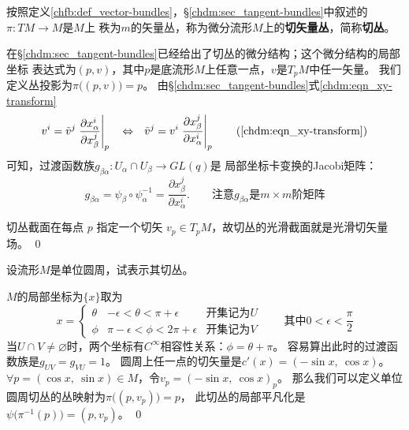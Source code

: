 \begin{example}\label{chfb:exm_tb}
    按照定义\ref{chfb:def_vector-bundles}，\S \ref{chdm:sec_tangent-bundles}中叙述的$\pi:TM\to M$是$M$上
    秩为$m$的矢量丛，称为微分流形$M$上的\textbf{切矢量丛}，简称\textbf{切丛}。
\end{example}
在\S \ref{chdm:sec_tangent-bundles}已经给出了切丛的微分结构；这个微分结构的局部坐标
表达式为$(p,v)$，其中$p$是底流形$M$上任意一点，$v$是$T_pM$中任一矢量。
我们定义丛投影为$\pi\bigl( (p,v)\bigr)=p$。
由\S \ref{chdm:sec_tangent-bundles}式\eqref{chdm:eqn_xy-transform}
\begin{equation}
    v^i = \tilde{v}^j \left. \frac{\partial {x}^i_\alpha}{\partial {x}^j_\beta}  \right | _p
    {\quad \Leftrightarrow \quad}
    \tilde{v}^j = {v}^i \left. \frac{\partial {x}^j_\beta}{\partial {x}^i_\alpha}  \right | _p
    \tag{\ref{chdm:eqn_xy-transform}}
\end{equation}
可知，过渡函数族$g_{\beta\alpha}: U_\alpha \cap U_\beta \to GL(q)$是
局部坐标卡变换的Jacobi矩阵：
\begin{equation}
    g_{\beta\alpha} = \psi_\beta \circ \psi^{-1}_{\alpha}
    = \frac{\partial {x}^j_\beta}{\partial {x}^i_\alpha}  .
    \qquad \text{注意}g_{\beta\alpha}\text{是} m\times m \text{阶矩阵}
\end{equation}

切丛截面在每点 $p$ 指定一个切矢 $v_p\in T_pM$，故切丛的光滑截面就是光滑切矢量场。
\qed

\begin{example}
    设流形$M$是单位圆周，试表示其切丛。
\end{example}
$M$的局部坐标为$\{x\}$取为
\begin{equation*}
    x=\left\{\begin{array}{ccc}
        \theta& -\epsilon <\theta<\pi+\epsilon & \text{开集记为}U \\
        \phi & \pi -\epsilon <\phi <2\pi +\epsilon  & \text{开集记为}V
    \end{array} \right.
    \qquad \text{其中} 0<\epsilon<\frac{\pi}{2}
\end{equation*}
当$U\cap V\neq \varnothing$时，两个坐标有$C^\infty$相容性关系：$\phi=\theta + \pi$。
容易算出此时的过渡函数族是$g_{UV}=g_{VU}=1$。
圆周上任一点的切矢量是$c'(x)=(-\sin x,\ \cos x)$。
$\forall p=(\cos x,\ \sin x)\in M$，令$v_p=(-\sin x,\ \cos x)_p$。
那么我们可以定义单位圆周切丛的丛映射为$\pi \bigl( (p,v_p) \bigr)=p$，
此切丛的局部平凡化是$\psi\bigl(\pi^{-1}(p) \bigr)=(p,v_p)$。
\qed

